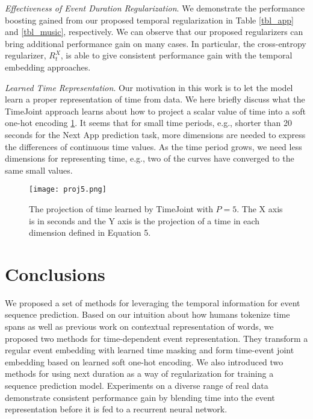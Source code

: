 \documentclass{article} %
\begin{document}
\emph{Effectiveness of Event Duration Regularization}. We demonstrate the performance boosting gained from our proposed temporal regularization in Table \ref{tbl_app} and \ref{tbl_music}, respectively. We can observe that our proposed regularizers can bring additional performance gain on many cases. In particular, the cross-entropy regularizer, $R_{t}^X$, is able to give consistent performance gain with the temporal embedding approaches.

\emph{Learned Time Representation}. Our motivation in this work is to let the model learn a proper representation of time from data. We here briefly discuss what the TimeJoint approach learns about how to project a scalar value of time into a soft one-hot encoding \ref{proj_vis}. It seems that for small time periods, e.g., shorter than 20 seconds for the Next App prediction task, more dimensions are needed to express the differences of continuous time values. As the time period grows, we need less dimensions for representing time, e.g., two of the curves have converged to the same small values.

\begin{figure}[ht]
  \centering
  \texttt{[image: proj5.png]}
  \caption{\label{proj_vis}The projection of time learned by TimeJoint with $P=5$. The X axis is in seconds and the Y axis is the projection of a time in each dimension defined in Equation 5.}
\end{figure}

\section{Conclusions}
We proposed a set of methods for leveraging the temporal information for event sequence prediction. Based on our intuition about how humans tokenize time spans as well as previous work on contextual representation of words, we proposed two methods for time-dependent event representation. They transform a regular event embedding with learned time masking and form time-event joint embedding based on learned soft one-hot encoding. We also introduced two methods for using next duration as a way of regularization for training a sequence prediction model. Experiments on a diverse range of real data demonstrate consistent performance gain by blending time into the event representation before it is fed to a recurrent neural network.

\end{document}
